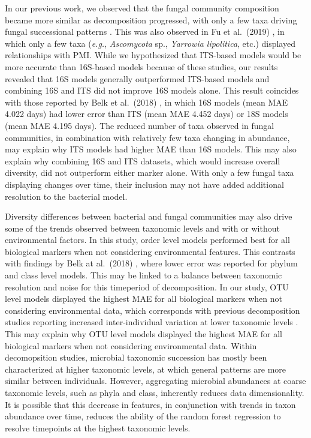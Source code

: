 \documentclass[
  10pt,
  letterpaper,
]{article}
\begin{document}
In our previous work, we observed that the fungal community composition
became more similar as decomposition progressed, with only a few taxa
driving fungal successional patterns \citep{mason_body_2022}. This was
also observed in Fu et al.~(2019) \citep{fu_fungal_2019}, in which only
a few taxa (\emph{e.g.}, \emph{Ascomycota} sp., \emph{Yarrowia
lipolitica}, etc.) displayed relationships with PMI. While we
hypothesized that ITS-based models would be more accurate than 16S-based
models because of these studies, our results revealed that 16S models
generally outperformed ITS-based models and combining 16S and ITS did
not improve 16S models alone. This result coincides with those reported
by Belk et al.~(2018) \citep{belk_microbiome_2018}, in which 16S models
(mean MAE 4.022 days) had lower error than ITS (mean MAE 4.452 days) or
18S models (mean MAE 4.195 days). The reduced number of taxa observed in
fungal communities, in combination with relatively few taxa changing in
abundance, may explain why ITS models had higher MAE than 16S models.
This may also explain why combining 16S and ITS datasets, which would
increase overall diversity, did not outperform either marker alone. With
only a few fungal taxa displaying changes over time, their inclusion may
not have added additional resolution to the bacterial model.

Diversity differences between bacterial and fungal communities may also
drive some of the trends observed between taxonomic levels and with or
without environmental factors. In this study, order level models
performed best for all biological markers when not considering
environmental features. This contrasts with findings by Belk at
al.~(2018) \citep{belk_microbiome_2018}, where lower error was reported
for phylum and class level models. This may be linked to a balance
between taxonomic resolution and noise for this timeperiod of
decomposition. In our study, OTU level models displayed the highest MAE
for all biological markers when not considering environmental data,
which corresponds with previous decomposition studies reporting
increased inter-individual variation at lower taxonomic levels
\citep{metcalf_microbial_2016, mason_body_2022, taylor_soil_2024}. This
may explain why OTU level models displayed the highest MAE for all
biological markers when not considering environmental data. Within
decomopsition studies, microbial taxonomic succession has mostly been
characterized at higher taxonomic levels, at which general patterns are
more similar between individuals. However, aggregating microbial
abundances at coarse taxonomic levels, such as phyla and class,
inherently reduces data dimensionality. It is possible that this
decrease in features, in conjunction with trends in taxon abundance over
time, reduces the ability of the random forest regression to resolve
timepoints at the highest taxonomic levels.
\end{document}
